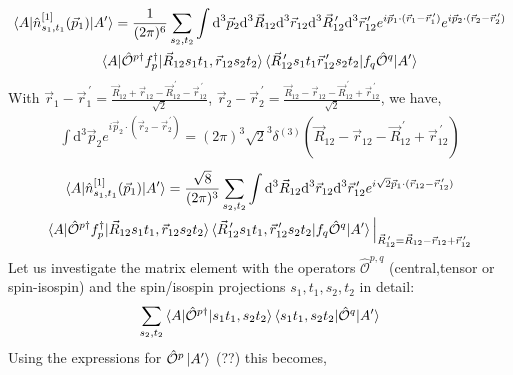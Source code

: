 \documentclass[10pt]{article}
\begin{document}
\begin{multline*}
	\braket{ A | \hat{n}_{s_1,t_1}^{[1]}(\vec{p}_1) | A'} =  \frac{1}{(2 \pi)^{6}} \sum_{s_2,t_2} \int \text{d}^{3} \vec{p}_{2} \text{d}^{3} \vec{R}_{12} \text{d}^{3} \vec{r}_{12} \text{d}^{3} \vec{R}_{12}^{\, \prime} \text{d}^{3} \vec{r}_{12}^{\, \prime}  e^{ i \vec{p}_{1} \cdot ( \vec{r}_{1} - \vec{r}_{1}^{\, \prime}) } e^{ i \vec{p}_{2} \cdot ( \vec{r}_{2} - \vec{r}_{2}^{\, \prime} )} \\
	\braket{ A | \hat{\mathcal{O}}^{p\dagger} f_{p}^{\dagger} | \vec{R}_{12} s_1 t_1, \vec{r}_{12} s_2 t_2 } \braket{ \vec{R}_{12}^{\, \prime} s_1 t_1 \vec{r}_{12}^{\, \prime} s_2 t_2 | f_{q} \hat{ \mathcal{O}}^{q} | A'}
\end{multline*}
With $ \vec{r}_{1} - \vec{r}_{1}^{\, \prime} = \frac{\vec{R}_{12} + \vec{r}_{12} - \vec{R}_{12}^{\, \prime} - \vec{r}_{12}^{\, \prime}}{\sqrt{2}}$, $\vec{r}_{2} - \vec{r}_{2}^{\, \prime} = \frac{\vec{R}_{12} - \vec{r}_{12} - \vec{R}_{12}^{\, \prime} + \vec{r}_{12}^{\, \prime}}{\sqrt{2}}$, we have,
\begin{align*}
	\int \text{d}^{3} \vec{p}_{2} e^{ i \vec{p}_{2} \cdot ( \vec{r}_{2} - \vec{r}_{2}^{\, \prime} )} = (2 \pi)^{3} \sqrt{2}^{3} \delta^{(3)}( \vec{R}_{12} - \vec{r}_{12} - \vec{R}_{12}^{\, \prime} + \vec{r}_{12}^{\, \prime} )
\end{align*}
\begin{multline*}
	\braket{ A | \hat{n}_{s_1, t_1}^{[1]}(\vec{p}_1) | A'} = \frac{\sqrt{8}}{(2 \pi)^{3}} \sum_{s_2,t_2} \int \text{d}^{3} \vec{R}_{12} \text{d}^{3} \vec{r}_{12} \text{d}^{3} \vec{r}_{12}^{\, \prime}  e^{ i \sqrt{2} \vec{p}_{1} \cdot ( \vec{r}_{12} - \vec{r}_{12}^{\, \prime}) } \\
	 \braket{ A | \hat{\mathcal{O}}^{p\dagger} f_{p}^{\dagger} | \vec{R}_{12} s_1 t_1, \vec{r}_{12} s_2 t_2 } \braket{ \vec{R}_{12}^{\, \prime} s_1 t_1 , \vec{r}_{12}^{\, \prime} s_2 t_2 | f_{q} \hat{ \mathcal{O}}^{q} | A'} \Big|_{\vec{R}_{12}^{\, \prime} = \vec{R}_{12} - \vec{r}_{12}  + \vec{r}_{12}^{\, \prime} }
\end{multline*}
Let us investigate the matrix element with the operators $ \hat{\mathcal{O}}^{p,q}$ (central,tensor or spin-isospin) and the spin/isospin projections $s_1,t_1,s_2,t_2$ in detail: 
\begin{align*}
\sum_{s_2,t_2} \braket{ A | \hat{\mathcal{O}}^{p\dagger} | s_1 t_1, s_2 t_2} \braket{ s_1 t_1, s_2 t_2 | \hat{ \mathcal{O}}^{q} | A'}
\end{align*}
Using the expressions for $ \hat{ \mathcal{O}}^{p}  \ket{ A'} $ (??) this becomes,
\end{document}
